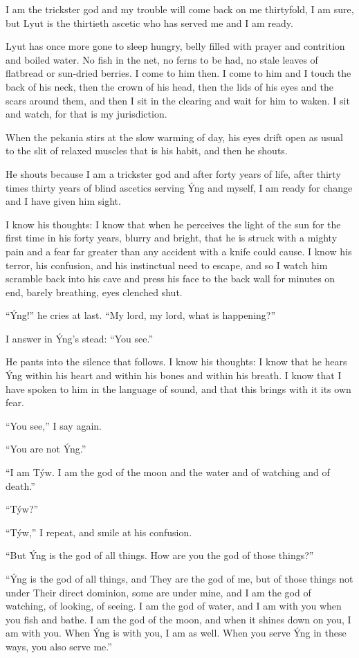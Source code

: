 I am the trickster god and my trouble will come back on me thirtyfold, I am sure, but Lyut is the thirtieth ascetic who has served me and I am ready.

Lyut has once more gone to sleep hungry, belly filled with prayer and contrition and boiled water. No fish in the net, no ferns to be had, no stale leaves of flatbread or sun-dried berries. I come to him then. I come to him and I touch the back of his neck, then the crown of his head, then the lids of his eyes and the scars around them, and then I sit in the clearing and wait for him to waken. I sit and watch, for that is my jurisdiction.

When the pekania stirs at the slow warming of day, his eyes drift open as usual to the slit of relaxed muscles that is his habit, and then he shouts.

He shouts because I am a trickster god and after forty years of life, after thirty times thirty years of blind ascetics serving Ýng and myself, I am ready for change and I have given him sight.

I know his thoughts: I know that when he perceives the light of the sun for the first time in his forty years, blurry and bright, that he is struck with a mighty pain and a fear far greater than any accident with a knife could cause. I know his terror, his confusion, and his instinctual need to escape, and so I watch him scramble back into his cave and press his face to the back wall for minutes on end, barely breathing, eyes clenched shut.

``Ýng!'' he cries at last. ``My lord, my lord, what is happening?''

I answer in Ýng's stead: ``You see.''

He pants into the silence that follows. I know his thoughts: I know that he hears Ýng within his heart and within his bones and within his breath. I know that I have spoken to him in the language of sound, and that this brings with it its own fear.

``You see,'' I say again.

``You are not Ýng.''

``I am Týw. I am the god of the moon and the water and of watching and of death.''

``Týw?''

``Týw,'' I repeat, and smile at his confusion.

``But Ýng is the god of all things. How are you the god of those things?''

``Ýng is the god of all things, and They are the god of me, but of those things not under Their direct dominion, some are under mine, and I am the god of watching, of looking, of seeing. I am the god of water, and I am with you when you fish and bathe. I am the god of the moon, and when it shines down on you, I am with you. When Ýng is with you, I am as well. When you serve Ýng in these ways, you also serve me.''

